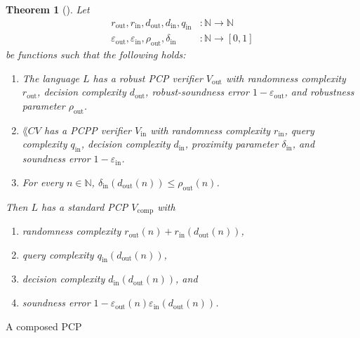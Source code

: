 \documentclass[english,12pt]{reedthesis}
\theoremstyle{plain}
\newtheorem{thm}{Theorem}[section]
\theoremstyle{definition}
\theoremstyle{remark}
\DeclareMathOperator{\comp}{comp}
\DeclareMathOperator{\out}{out}
\DeclareMathOperator{\oin}{in}
\begin{document}
\begin{thm}[{\cite[Theorem 2.7]{BGHSV06}}]\label{thm:composition}
  Let
  \begin{align*}
    r_{\out}, r_{\oin}, d_{\out}, d_{\oin}, q_{\oin}&\colon \mathbb{N} \rightarrow \mathbb{N} \\
    \varepsilon_{\out}, \varepsilon_{\oin}, \rho_{\out}, \delta_{\oin}&\colon \mathbb{N} \rightarrow [0, 1]
  \end{align*}
  be functions such that the following holds:
  \begin{enumerate}
    \item The language $L$ has a robust PCP verifier $V_{\out}$ with randomness
          complexity $r_{\out}$, decision complexity $d_{\out}$,
          robust-soundness error $1 - \varepsilon_{\out}$, and robustness parameter
          $\rho_{\out}$.
    \item $\lang{CV}$ has a PCPP verifier $V_{\oin}$ with randomness complexity
          $r_{\oin}$, query complexity $q_{\oin}$, decision complexity
          $d_{\oin}$, proximity parameter $\delta_{\oin}$, and soundness error
          $1 - \varepsilon_{\oin}$.
    \item For every $n \in \mathbb{N}$, $\delta_{\oin}(d_{\out}(n)) \le \rho_{\out}(n)$.
  \end{enumerate}
  Then $L$ has a standard PCP $V_{\comp}$ with
  \begin{enumerate}[label=\alph*.]
    \item randomness complexity $r_{\out}(n) + r_{\oin}(d_{\out}(n))$,
    \item query complexity $q_{\oin}(d_{\out}(n))$,
    \item decision complexity $d_{\oin}(d_{\out}(n))$, and
    \item soundness error $1 - \varepsilon_{\out}(n)\varepsilon_{\oin}(d_{\out}(n))$.
  \end{enumerate}
\end{thm}

\begin{algorithm}[htbp]
  \caption{A composed PCP~\cite[Theorem 2.7]{BGHSV06}}\label{alg:composed-pcp}
\end{algorithm}
\end{document}
